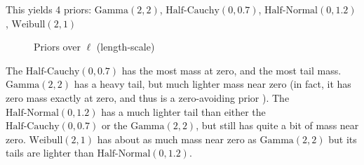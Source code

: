 \documentclass{article}
\begin{document}
This yields 4 priors: $\text{Gamma}(2, 2)$, $\text{Half-Cauchy}(0, 0.7)$,
$\text{Half-Normal}(0, 1.2)$, $\text{Weibull}(2, 1)$
\begin{figure}[t] 
  \caption{Priors over $\ell$ (length-scale)} \label{prior_plot}
\end{figure}
The $\text{Half-Cauchy}(0, 0.7)$ has the most mass at zero, and the most tail
mass. $\text{Gamma}(2, 2)$ has a heavy tail, but much lighter mass near zero
(in fact, it has zero mass exactly at zero, and thus is a zero-avoiding prior
\citet{gelman2014bayesian}). The $\text{Half-Normal}(0, 1.2)$ has a much
lighter tail than either the $\text{Half-Cauchy}(0, 0.7)$ or the
$\text{Gamma}(2, 2)$, but still has quite a bit of mass near zero.
$\text{Weibull}(2, 1)$ has about as much mass near zero as $\text{Gamma}(2, 2)$
but its tails are lighter than $\text{Half-Normal}(0, 1.2)$.
\end{document}
